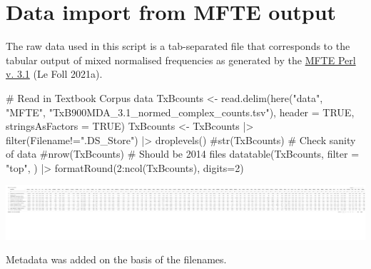\documentclass[
  letterpaper,
  DIV=11,
  numbers=noendperiod]{scrreprt}
\newenvironment{Shaded}{\begin{snugshade}}{\end{snugshade}}
\newcommand{\AttributeTok}[1]{\textcolor[rgb]{0.40,0.45,0.13}{#1}}
\newcommand{\CommentTok}[1]{\textcolor[rgb]{0.37,0.37,0.37}{#1}}
\newcommand{\ConstantTok}[1]{\textcolor[rgb]{0.56,0.35,0.01}{#1}}
\newcommand{\DecValTok}[1]{\textcolor[rgb]{0.68,0.00,0.00}{#1}}
\newcommand{\FunctionTok}[1]{\textcolor[rgb]{0.28,0.35,0.67}{#1}}
\newcommand{\NormalTok}[1]{\textcolor[rgb]{0.00,0.23,0.31}{#1}}
\newcommand{\OtherTok}[1]{\textcolor[rgb]{0.00,0.23,0.31}{#1}}
\newcommand{\SpecialCharTok}[1]{\textcolor[rgb]{0.37,0.37,0.37}{#1}}
\newcommand{\StringTok}[1]{\textcolor[rgb]{0.13,0.47,0.30}{#1}}
\begin{document}
\section{Data import from MFTE
output}\label{data-import-from-mfte-output}

The raw data used in this script is a tab-separated file that
corresponds to the tabular output of mixed normalised frequencies as
generated by the
\href{https://github.com/mshakirDr/MultiFeatureTaggerEnglish}{MFTE Perl
v. 3.1} (Le Foll 2021a).

\begin{Shaded}
\begin{Highlighting}[]
\CommentTok{\# Read in Textbook Corpus data}
\NormalTok{TxBcounts }\OtherTok{\textless{}{-}} \FunctionTok{read.delim}\NormalTok{(}\FunctionTok{here}\NormalTok{(}\StringTok{"data"}\NormalTok{, }\StringTok{"MFTE"}\NormalTok{, }\StringTok{"TxB900MDA\_3.1\_normed\_complex\_counts.tsv"}\NormalTok{), }\AttributeTok{header =} \ConstantTok{TRUE}\NormalTok{, }\AttributeTok{stringsAsFactors =} \ConstantTok{TRUE}\NormalTok{)}
\NormalTok{TxBcounts }\OtherTok{\textless{}{-}}\NormalTok{ TxBcounts }\SpecialCharTok{|\textgreater{}} 
  \FunctionTok{filter}\NormalTok{(Filename}\SpecialCharTok{!=}\StringTok{".DS\_Store"}\NormalTok{) }\SpecialCharTok{|\textgreater{}}  
  \FunctionTok{droplevels}\NormalTok{()}
\CommentTok{\#str(TxBcounts) \# Check sanity of data}
\CommentTok{\#nrow(TxBcounts) \# Should be 2014 files}
\FunctionTok{datatable}\NormalTok{(TxBcounts,}
  \AttributeTok{filter =} \StringTok{"top"}\NormalTok{,}
\NormalTok{) }\SpecialCharTok{|\textgreater{}} 
  \FunctionTok{formatRound}\NormalTok{(}\DecValTok{2}\SpecialCharTok{:}\FunctionTok{ncol}\NormalTok{(TxBcounts), }\AttributeTok{digits=}\DecValTok{2}\NormalTok{)}
\end{Highlighting}
\end{Shaded}

\includegraphics{AppendixE_files/figure-pdf/raw_data-1.pdf}

Metadata was added on the basis of the filenames.
\end{document}
